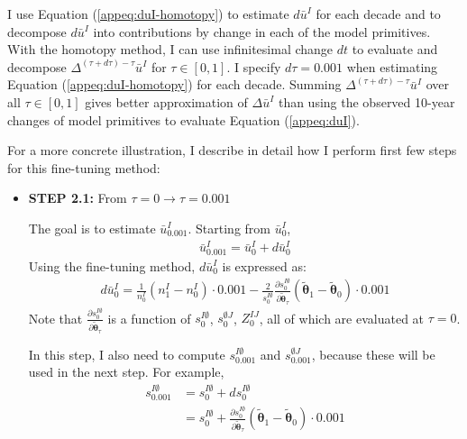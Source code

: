 I use Equation (\ref{appeq:duI-homotopy}) to estimate $d\bar{u}^I$ for each decade and to decompose $d\bar{u}^I$ into contributions by change in each of the model primitives. With the homotopy method, I can use infinitesimal change $dt$ to evaluate and decompose $\Delta^{(\tau+d\tau)-\tau} \bar{u}^I$ for $\tau \in [0,1]$. I specify $d\tau = 0.001$ when estimating Equation (\ref{appeq:duI-homotopy}) for each decade. Summing $\Delta^{(\tau+d\tau)-\tau}\bar{u}^I$ over all  $\tau \in [0,1]$ gives better approximation of $\Delta \bar{u}^I$ than using the observed 10-year changes of model primitives to evaluate Equation (\ref{appeq:duI}). 

For a more concrete illustration, I describe in detail how I perform first few steps for this fine-tuning method: 
\begin{itemize}
	\item \textbf{STEP 2.1:} From $\tau = 0 \rightarrow \tau = 0.001$
	
	The goal is to estimate $\bar{u}^I_{0.001}$. Starting from $\bar{u}^I_0$, 
	\begin{align*}
		\bar{u}^I_{0.001} = \bar{u}^I_0 + d\bar{u}^I_0
	\end{align*}
	Using the fine-tuning method, $d\bar{u}^I_0$ is expressed as:
	\begin{align*}
		d\bar{u}^I_0 = \frac{1}{n^I_0} (n^I_1 - n^I_0)\cdot 0.001 - \frac{2}{s^{I\emptyset}_0} \frac{\partial s^{I\emptyset}_0}{\partial \tilde{\boldsymbol{\theta}}_\tau} (\tilde{\boldsymbol{\theta}}_1 - \tilde{\boldsymbol{\theta}}_0)\cdot 0.001
	\end{align*}
	Note that $\frac{\partial s^{I\emptyset}_0}{\partial \tilde{\boldsymbol{\theta}}_\tau}$ is a function of $s^{I\emptyset}_0$, $s^{\emptyset J}_0$, $Z^{IJ}_0$, all of which are evaluated at $\tau = 0$. 
	
	In this step, I also need to compute $s^{I\emptyset}_{0.001}$ and $s^{\emptyset J}_{0.001}$, because these will be used in the next step. For example, 
	\begin{align*}
		s^{I\emptyset}_{0.001} &= s^{I\emptyset}_{0} + d s^{I\emptyset}_{0} \\
		&= s^{I\emptyset}_{0} + \frac{\partial s^{I\emptyset}_0}{\partial \tilde{\boldsymbol{\theta}}_\tau} (\tilde{\boldsymbol{\theta}}_1 - \tilde{\boldsymbol{\theta}}_0)\cdot 0.001
	\end{align*}
\end{itemize}
